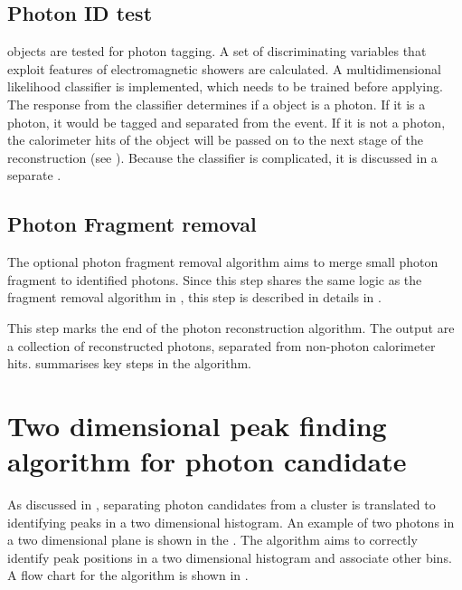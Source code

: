 \subsection{Photon ID test}
\label{sec:photonIDtest}

\ShowerPeak objects are tested for photon tagging.  A set of discriminating variables that exploit features of electromagnetic showers are calculated. A multidimensional likelihood classifier is implemented, which needs to be trained before applying. The response from the classifier determines if a \ShowerPeak object is a photon. If it is a photon, it would be tagged and separated from the event. If it is not a photon, the calorimeter hits of the \ShowerPeak object will be passed on to the next stage of the reconstruction (see ). Because the classifier is complicated, it is discussed in a separate .

\subsection{Photon Fragment removal}
\label{sec:photonRecoFragRemoval}

The optional photon fragment removal algorithm aims to merge small photon fragment to identified photons. Since this step shares the same logic as the fragment removal algorithm in , this step is described in details in .


This step marks the end of the photon reconstruction algorithm. The output are a collection of reconstructed photons, separated from non-photon calorimeter hits.   summarises key steps in the \PhotonReconstruction algorithm.

\section{Two dimensional peak finding algorithm for photon candidate}
\label{sec:peakFinding}

As discussed in , separating photon candidates from a cluster is translated to identifying peaks in a two dimensional histogram. An example of two photons in a two dimensional plane is shown in the . The \peakFinding algorithm aims to correctly identify peak positions in a two dimensional histogram and associate other bins. A flow chart for the algorithm is shown in .

